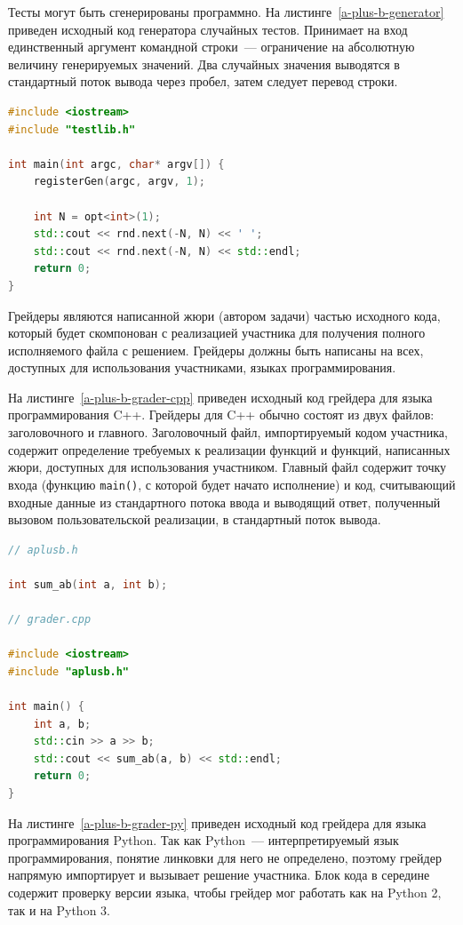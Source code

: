 \documentclass[times,specification,annotation]{style/itmo-student-thesis/itmo-student-thesis}
\begin{document}
Тесты могут быть сгенерированы программно. На листинге~\ref{a-plus-b-generator} приведен исходный код генератора случайных тестов. Принимает на вход единственный аргумент командной строки~--- ограничение на абсолютную величину генерируемых значений. Два случайных значения выводятся в стандартный поток вывода через пробел, затем следует перевод строки.

\begin{lstlisting}[float=!h,caption={Пример генератора},label={a-plus-b-generator},language=c++]
#include <iostream>
#include "testlib.h"
 
int main(int argc, char* argv[]) {
    registerGen(argc, argv, 1);
 
    int N = opt<int>(1);
    std::cout << rnd.next(-N, N) << ' ';
    std::cout << rnd.next(-N, N) << std::endl;
    return 0;
}
\end{lstlisting}

Грейдеры являются написанной жюри (автором задачи) частью исходного кода, который будет скомпонован с реализацией участника для получения полного исполняемого файла с решением. Грейдеры должны быть написаны на всех, доступных для использования участниками, языках программирования. 

На листинге~\ref{a-plus-b-grader-cpp} приведен исходный код грейдера для языка программирования C++. Грейдеры для C++ обычно состоят из двух файлов: заголовочного и главного. Заголовочный файл, импортируемый кодом участника, содержит определение требуемых к реализации функций и функций, написанных жюри, доступных для использования участником. Главный файл содержит точку входа (функцию \texttt{main()}, с которой будет начато исполнение) и код, считывающий входные данные из стандартного потока ввода и выводящий ответ, полученный вызовом пользовательской реализации, в стандартный поток вывода.

\begin{lstlisting}[float=!h,caption={Пример грейдера для языка C++},label={a-plus-b-grader-cpp},language=c++]
// aplusb.h

int sum_ab(int a, int b);

// grader.cpp

#include <iostream>
#include "aplusb.h"
 
int main() {
    int a, b;
    std::cin >> a >> b;
    std::cout << sum_ab(a, b) << std::endl;
    return 0;
}
\end{lstlisting}

На листинге~\ref{a-plus-b-grader-py} приведен исходный код грейдера для языка программирования Python. Так как Python~--- интерпретируемый язык программирования, понятие линковки для него не определено, поэтому грейдер напрямую импортирует и вызывает решение участника. Блок кода в середине содержит проверку версии языка, чтобы грейдер мог работать как на Python 2, так и на Python 3.
\end{document}
